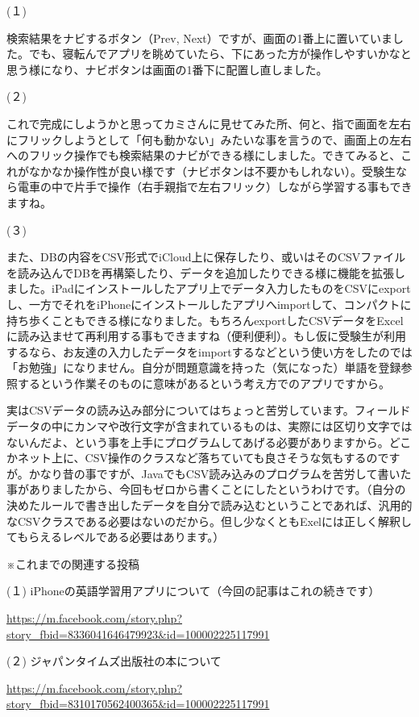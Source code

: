 \documentclass[facebook_diary.tex]{subfiles}
\begin{document}
(１)

検索結果をナビするボタン（Prev, Next）ですが、画面の1番上に置いていました。でも、寝転んでアプリを眺めていたら、下にあった方が操作しやすいかなと思う様になり、ナビボタンは画面の1番下に配置し直しました。

(２)

これで完成にしようかと思ってカミさんに見せてみた所、何と、指で画面を左右にフリックしようとして「何も動かない」みたいな事を言うので、画面上の左右へのフリック操作でも検索結果のナビができる様にしました。できてみると、これがなかなか操作性が良い様です（ナビボタンは不要かもしれない）。受験生なら電車の中で片手で操作（右手親指で左右フリック）しながら学習する事もできますね。

(３)

また、DBの内容をCSV形式でiCloud上に保存したり、或いはそのCSVファイルを読み込んでDBを再構築したり、データを追加したりできる様に機能を拡張しました。iPadにインストールしたアプリ上でデータ入力したものをCSVにexportし、一方でそれをiPhoneにインストールしたアプリへimportして、コンパクトに持ち歩くこともできる様になりました。もちろんexportしたCSVデータをExcelに読み込ませて再利用する事もできますね（便利便利）。もし仮に受験生が利用するなら、お友達の入力したデータをimportするなどという使い方をしたのでは「お勉強」になりません。自分が問題意識を持った（気になった）単語を登録参照するという作業そのものに意味があるという考え方でのアプリですから。


実はCSVデータの読み込み部分についてはちょっと苦労しています。フィールドデータの中にカンマや改行文字が含まれているものは、実際には区切り文字ではないんだよ、という事を上手にプログラムしてあげる必要がありますから。どこかネット上に、CSV操作のクラスなど落ちていても良さそうな気もするのですが。かなり昔の事ですが、JavaでもCSV読み込みのプログラムを苦労して書いた事がありましたから、今回もゼロから書くことにしたというわけです。（自分の決めたルールで書き出したデータを自分で読み込むということであれば、汎用的なCSVクラスである必要はないのだから。但し少なくともExelには正しく解釈してもらえるレベルである必要はあります。）


※これまでの関連する投稿


(１) iPhoneの英語学習用アプリについて（今回の記事はこれの続きです）

\url{https://m.facebook.com/story.php?story_fbid=8336041646479923&id=100002225117991}




(２) ジャパンタイムズ出版社の本について

\url{https://m.facebook.com/story.php?story_fbid=8310170562400365&id=100002225117991}
\end{document}
